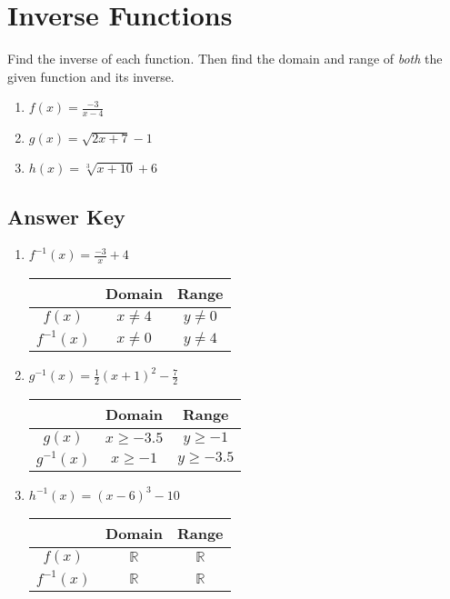 \chapter{Inverse Functions}

Find the inverse of each function. Then find the domain and range of \emph{both} the given function and its inverse.

\begin{multicols}{3}
\begin{enumerate}
	\item $f(x) = \frac{-3}{x-4}$
	\item $g(x) = \sqrt{2x+7}-1 $
	\item $h(x) = \sqrt[3]{x+10}+6$
\end{enumerate}	\setcounter{Review}{\value{enumi}}
\end{multicols}

\newpage

\section{Answer Key}

\begin{enumerate}
	\item $f^{-1}(x) = \frac{-3}{x} + 4$    \newline\\
    \begin{tabular}{c|c|c}
        & Domain & Range  \\    \hline
        $f(x)$ & $x \neq 4$ & $y \neq 0$ \\ \hline
        $f^{-1}(x)$ & $x \neq 0$ & $y \neq 4$ \\
    \end{tabular}
    \item $g^{-1}(x) = \frac{1}{2}(x+1)^2 - \frac{7}{2}$ \newline\\
    \begin{tabular}{c|c|c}
        & Domain & Range  \\    \hline
        $g(x)$ & $x \geq -3.5$ & $y \geq -1$ \\ \hline
        $g^{-1}(x)$ & $x \geq -1$ & $y \geq -3.5$ \\
    \end{tabular}
    \item $h^{-1}(x) = (x-6)^3 - 10$ \newline\\
    \begin{tabular}{c|c|c}
        & Domain & Range  \\    \hline
        $f(x)$ & $\mathbb{R}$ & $\mathbb{R}$ \\ \hline
        $f^{-1}(x)$ & $\mathbb{R}$ & $\mathbb{R}$ \\
    \end{tabular}
\end{enumerate}